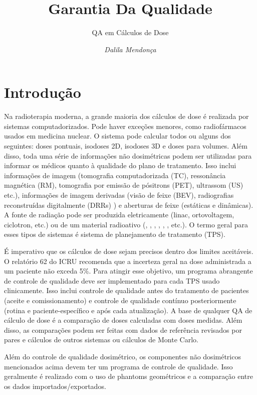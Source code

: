 \documentclass[11pt,a4paper]{article}
\title{\LobsterTwo\Huge{Garantia Da Qualidade}}
\author{\LobsterTwo\Large{QA em Cálculos de Dose}\nocite{*}}
\date{\LobsterTwo\textit{Dalila Mendonça}}
\begin{document}
	\maketitle

\section{Introdução}

	Na radioterapia moderna, a grande maioria dos cálculos de dose é realizada por sistemas computadorizados. Pode haver exceções menores, como radiofármacos usados em medicina nuclear. O sistema pode calcular todos ou alguns dos seguintes: doses pontuais, isodoses 2D, isodoses 3D e doses para volumes. Além disso, toda uma série de informações não dosimétricas podem ser utilizadas para informar os médicos quanto à qualidade do plano de tratamento. Isso inclui informações de imagem (tomografia computadorizada (TC), ressonância magnética (RM), tomografia por emissão de pósitrons (PET), ultrassom (US) etc.), informações de imagem derivadas (visão de feixe (BEV), radiografias reconstruídas digitalmente (DRRs) ) e aberturas de feixe (estáticas e dinâmicas). A fonte de radiação pode ser produzida eletricamente (linac, ortovoltagem, ciclotron, etc.) ou de um material radioativo (, , , , , , etc.). O termo geral para esses tipos de sistemas é sistema de planejamento de tratamento (TPS).

	É imperativo que os cálculos de dose sejam precisos dentro dos limites aceitáveis. O relatório 62 do ICRU recomenda que a incerteza geral na dose administrada a um paciente não exceda 5\%. Para atingir esse objetivo, um programa abrangente de controle de qualidade deve ser implementado para cada TPS usado clinicamente. Isso inclui controle de qualidade antes do tratamento de pacientes (aceite e comissionamento) e controle de qualidade contínuo posteriormente (rotina e paciente-específico e após cada atualização). A base de qualquer QA de cálculo de dose é a comparação de doses calculadas com doses medidas. Além disso, as comparações podem ser feitas com dados de referência revisados por pares e cálculos de outros sistemas ou cálculos de Monte Carlo.

	Além do controle de qualidade dosimétrico, os componentes não dosimétricos mencionados acima devem ter um programa de controle de qualidade. Isso geralmente é realizado com o uso de phantoms geométricos e a comparação entre os dados importados/exportados.
\end{document}
